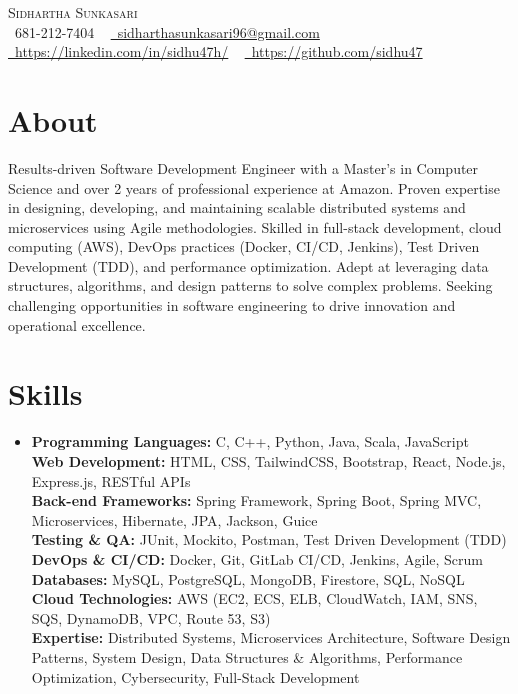 \documentclass[letterpaper,10.5pt]{article}
\begin{document}
\begin{center}
    {\Huge \scshape Sidhartha Sunkasari} \\ 
    \small \raisebox{-0.1\height}\faPhone\ 681-212-7404 ~ 
    \href{mailto:sidharthasunkasari96@gmail.com}{\raisebox{-0.2\height}\faEnvelope\ sidharthasunkasari96@gmail.com} ~
    \href{https://linkedin.com/in/sidhu47h/}{\raisebox{-0.2\height}\faLinkedin\ https://linkedin.com/in/sidhu47h/} ~
    \href{https://github.com/sidhu47}{\raisebox{-0.2\height}\faGithub\ https://github.com/sidhu47}
\end{center}
\section{About}
{\fontsize{10pt}{10pt}\selectfont
Results-driven Software Development Engineer with a Master's in Computer Science and over 2 years of professional experience at Amazon. Proven expertise in designing, developing, and maintaining scalable distributed systems and microservices using Agile methodologies. Skilled in full-stack development, cloud computing (AWS), DevOps practices (Docker, CI/CD, Jenkins), Test Driven Development (TDD), and performance optimization. Adept at leveraging data structures, algorithms, and design patterns to solve complex problems. Seeking challenging opportunities in software engineering to drive innovation and operational excellence.
}
\section{Skills}
\begin{itemize}[leftmargin=0.15in, label={}]
    \small\item{ \textbf{Programming Languages:} C, C++, Python, Java, Scala, JavaScript \\
\textbf{Web Development:} HTML, CSS, TailwindCSS, Bootstrap, React, Node.js, Express.js, RESTful APIs \\
\textbf{Back-end Frameworks:} Spring Framework, Spring Boot, Spring MVC, Microservices, Hibernate, JPA, Jackson, Guice \\
\textbf{Testing \& QA:} JUnit, Mockito, Postman, Test Driven Development (TDD) \\
\textbf{DevOps \& CI/CD:} Docker, Git, GitLab CI/CD, Jenkins, Agile, Scrum \\
\textbf{Databases:} MySQL, PostgreSQL, MongoDB, Firestore, SQL, NoSQL \\
\textbf{Cloud Technologies:} AWS (EC2, ECS, ELB, CloudWatch, IAM, SNS, SQS, DynamoDB, VPC, Route 53, S3) \\
\textbf{Expertise:} Distributed Systems, Microservices Architecture, Software Design Patterns, System Design, Data Structures \& Algorithms, Performance Optimization, Cybersecurity, Full-Stack Development }
\end{itemize}
\end{document}

